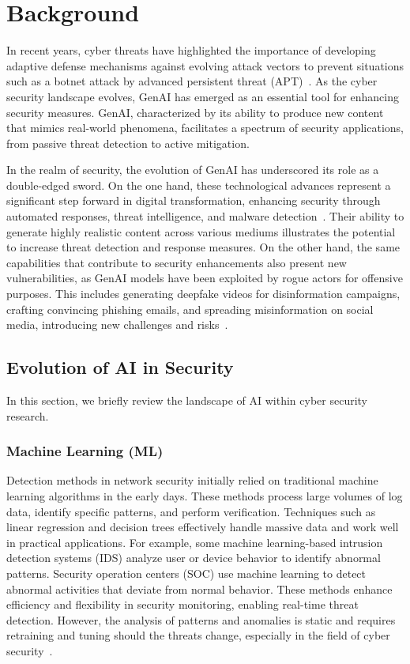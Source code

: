 \section{Background} \label{background}
%
In recent years, cyber threats have highlighted the importance of developing adaptive defense mechanisms against evolving attack vectors to prevent situations such as a botnet attack by advanced persistent threat (APT)~\citet{Daws_2024}.
As the cyber security landscape evolves, GenAI has emerged as an essential tool for enhancing security measures.
GenAI, characterized by its ability to produce new content that mimics real-world phenomena, facilitates a spectrum of security applications, from passive threat detection to active mitigation.

In the realm of security, the evolution of GenAI has underscored its role as a double-edged sword.
On the one hand, these technological advances represent a significant step forward in digital transformation, enhancing security through automated responses, threat intelligence, and malware detection~\citet{10198233}.
Their ability to generate highly realistic content across various mediums illustrates the potential to increase threat detection and response measures.
On the other hand, the same capabilities that contribute to security enhancements also present new vulnerabilities, as GenAI models have been exploited by rogue actors for offensive purposes.
This includes generating deepfake videos for disinformation campaigns, crafting convincing phishing emails, and spreading misinformation on social media, introducing new challenges and risks~\citet{eze2024analysis,mitra2024world}.
%
\subsection{Evolution of AI in Security}
%
In this section, we briefly review the landscape of AI within cyber security research. 
%
\subsubsection{Machine Learning (ML)}
%
Detection methods in network security initially relied on traditional machine learning algorithms in the early days.
These methods process large volumes of log data, identify specific patterns, and perform verification.
Techniques such as linear regression and decision trees effectively handle massive data and work well in practical applications.
For example, some machine learning-based intrusion detection systems (IDS) analyze user or device behavior to identify abnormal patterns.
Security operation centers (SOC) use machine learning to detect abnormal activities that deviate from normal behavior.
These methods enhance efficiency and flexibility in security monitoring, enabling real-time threat detection.
However, the analysis of patterns and anomalies is static and requires retraining and tuning should the threats change, especially in the field of cyber security~\citet{zeadally2020harnessing}.
% 
